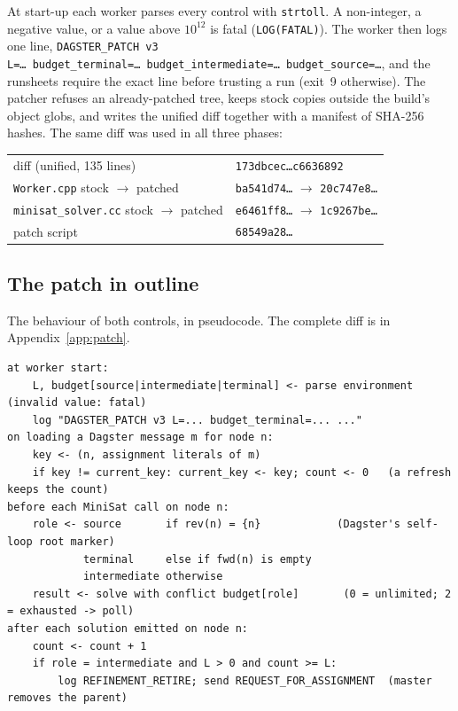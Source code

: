 \documentclass[11pt,a4paper]{article}
\begin{document}
At start-up each worker parses every control with \texttt{strtoll}. A non-integer, a negative value,
or a value above $10^{12}$ is fatal (\texttt{LOG(FATAL)}). The worker then logs one line,
\texttt{DAGSTER\_PATCH v3 L=\dots\ budget\_terminal=\dots\ budget\_intermediate=\dots\
budget\_source=\dots}, and the runsheets require the exact line before trusting a run (exit~9
otherwise). The patcher refuses an already-patched tree, keeps stock copies outside the build's
object globs, and writes the unified diff together with a manifest of SHA-256 hashes. The same diff
was used in all three phases:
\begin{center}\small
\begin{tabular}{@{}ll@{}}
\toprule
diff (unified, 135 lines) & \texttt{173dbcec\dots c6636892}\\
\texttt{Worker.cpp} stock $\to$ patched & \texttt{ba541d74\dots} $\to$ \texttt{20c747e8\dots}\\
\texttt{minisat\_solver.cc} stock $\to$ patched & \texttt{e6461ff8\dots} $\to$ \texttt{1c9267be\dots}\\
patch script & \texttt{68549a28\dots}\\
\bottomrule
\end{tabular}
\end{center}

\subsection{The patch in outline}

The behaviour of both controls, in pseudocode. The complete diff is in Appendix~\ref{app:patch}.
{\footnotesize\begin{verbatim}
at worker start:
    L, budget[source|intermediate|terminal] <- parse environment   (invalid value: fatal)
    log "DAGSTER_PATCH v3 L=... budget_terminal=... ..."
on loading a Dagster message m for node n:
    key <- (n, assignment literals of m)
    if key != current_key: current_key <- key; count <- 0   (a refresh keeps the count)
before each MiniSat call on node n:
    role <- source       if rev(n) = {n}            (Dagster's self-loop root marker)
            terminal     else if fwd(n) is empty
            intermediate otherwise
    result <- solve with conflict budget[role]       (0 = unlimited; 2 = exhausted -> poll)
after each solution emitted on node n:
    count <- count + 1
    if role = intermediate and L > 0 and count >= L:
        log REFINEMENT_RETIRE; send REQUEST_FOR_ASSIGNMENT  (master removes the parent)
\end{verbatim}}
\end{document}
